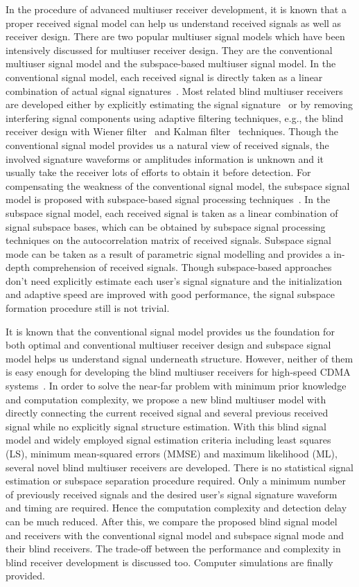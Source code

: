 \documentclass[conference]{IEEEtran}
\begin{document}
In the procedure of advanced multiuser receiver development, it is
known that a proper received signal model can help us understand
received signals as well as receiver design. There are two popular
multiuser signal models which have been intensively discussed for
multiuser receiver design. They are the conventional multiuser
signal model and the subspace-based multiuser signal model. In the
conventional signal model, each received signal is directly taken
as a linear combination of actual signal
signatures~\cite{Verd98,Honi95,Zhang02}. Most related blind
multiuser receivers are developed either by explicitly estimating
the signal signature~\cite{Torl97} or by removing interfering
signal components using adaptive filtering techniques, e.g., the
blind receiver design with Wiener filter~\cite{Honi95} and Kalman
filter~\cite{Zhang02} techniques. Though the conventional signal
model provides us a natural view of received signals, the involved
signature waveforms or amplitudes information is unknown and it
usually take the receiver lots of efforts to obtain it before
detection. For compensating the weakness of the conventional
signal model, the subspace signal model is proposed with
subspace-based signal processing techniques~\cite{Wang98}. In the
subspace signal model, each received signal is taken as a linear
combination of signal subspace bases, which can be obtained by
subspace signal processing techniques on the autocorrelation
matrix of received signals. Subspace signal mode can be taken as a
result of parametric signal modelling and provides a in-depth
comprehension of received signals. Though subspace-based
approaches don't need explicitly estimate each user's signal
signature and the initialization and adaptive speed are improved
with good performance, the signal subspace formation procedure
still is not trivial.

It is known that the conventional signal model provides us the
foundation for both optimal and conventional multiuser receiver
design and subspace signal model helps us understand signal
underneath structure. However, neither of them is easy enough for
developing the blind multiuser receivers for high-speed CDMA
systems~\cite{Andr05}. In order to solve the near-far problem with
minimum prior knowledge and computation complexity, we propose a
new blind multiuser model with directly connecting the current
received signal and several previous received signal while no
explicitly signal structure estimation. With this blind signal
model and widely employed signal estimation criteria including
least squares (LS), minimum mean-squared errors (MMSE) and maximum
likelihood (ML), several novel blind multiuser receivers are
developed. There is no statistical signal estimation or subspace
separation procedure required. Only a minimum number of previously
received signals and the desired user's signal signature waveform
and timing are required. Hence the computation complexity and
detection delay can be much reduced. After this, we compare the
proposed blind signal model and receivers with the conventional
signal model and subspace signal mode and their blind receivers.
The trade-off between the performance and complexity in blind
receiver development is discussed too. Computer simulations are
finally provided.
\end{document}
